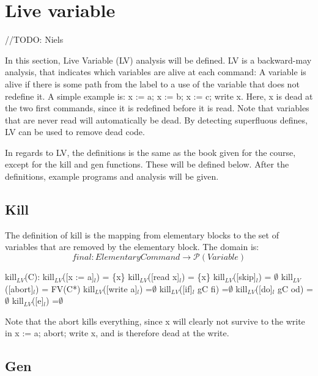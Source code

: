 
\section{Live variable}

//TODO: Niels

In this section, Live Variable (LV) analysis will be defined.
LV is a backward-may analysis, that indicates which variables are
alive at each command: A variable is alive if there is some path
from the label to a use of the variable that does not redefine it.
A simple example is: x := a; x := b; x := c; write x.
Here, x is dead at the two first commands, since it is redefined
before it is read. Note that variables that are never read will
automatically be dead. By detecting superfluous defines, LV
can be used to remove dead code.

In regards to LV, the definitions is the same as the book given for the course,
except for the kill and gen functions. These will be defined below.
After the definitions, example programs and analysis will be given.

\subsection{Kill}

The definition of kill is the mapping from elementary blocks to the set of variables
that are removed by the elementary block. The domain is:
\[final \colon Elementary Command \to \mathcal{P}(Variable)\]

kill$_{LV}$(C):\newline
kill$_{LV}$([x := a]$_l$)           = \{x\}
kill$_{LV}$([read x]$_l$)           = \{x\}
kill$_{LV}$([skip]$_l$)             = $\emptyset$\newline
kill$_{LV}$([abort]$_l$) 			= FV(C*)\newline
kill$_{LV}$([write a]$_l$)          =$\emptyset$\newline
kill$_{LV}$([if]$_l$ gC fi)         =$\emptyset$\newline
kill$_{LV}$([do]$_l$ gC od)         =$\emptyset$\newline
kill$_{LV}$([e]$_l$)                =$\emptyset$\newline

Note that the abort kills everything, since x will clearly not survive to the write in
x := a; abort; write x, and is therefore dead at the write.

\subsection{Gen}

